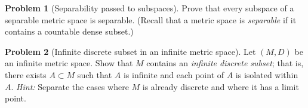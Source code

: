 \documentclass[12pt]{article}
\theoremstyle{definition} %
\newtheorem{problem}{Problem}
\theoremstyle{plain} %
\begin{document}
\begin{problem}[Separability passed to subspaces]
  Prove that every subspace of a separable metric space is separable.
  (Recall that a metric space is \emph{separable} if it contains a
  countable dense subset.)
\end{problem}

\begin{problem}[Infinite discrete subset in an infinite metric space]
  Let $(M,D)$ be an infinite metric space.
  Show that $M$ contains an \emph{infinite discrete subset};
  that is, there exists $A\subset M$ such that
  $A$ is infinite and each point of $A$ is isolated within~$A$.
  \emph{Hint:}  Separate the cases where $M$ is already discrete and
  where it has a limit point.
\end{problem}
\end{document}
